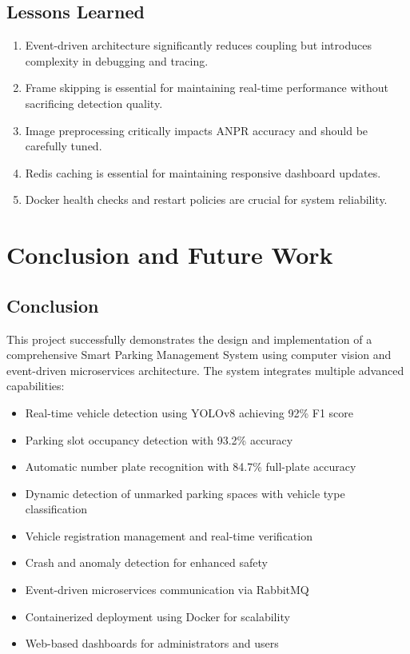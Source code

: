 \documentclass[12pt,a4paper]{report}
\begin{document}
\section{Lessons Learned}

\begin{enumerate}
    \item Event-driven architecture significantly reduces coupling but introduces complexity in debugging and tracing.
    \item Frame skipping is essential for maintaining real-time performance without sacrificing detection quality.
    \item Image preprocessing critically impacts ANPR accuracy and should be carefully tuned.
    \item Redis caching is essential for maintaining responsive dashboard updates.
    \item Docker health checks and restart policies are crucial for system reliability.
\end{enumerate}


\chapter{Conclusion and Future Work}

\section{Conclusion}

This project successfully demonstrates the design and implementation of a comprehensive Smart Parking Management System using computer vision and event-driven microservices architecture. The system integrates multiple advanced capabilities:

\begin{itemize}
    \item Real-time vehicle detection using YOLOv8 achieving 92\% F1 score
    \item Parking slot occupancy detection with 93.2\% accuracy
    \item Automatic number plate recognition with 84.7\% full-plate accuracy
    \item Dynamic detection of unmarked parking spaces with vehicle type classification
    \item Vehicle registration management and real-time verification
    \item Crash and anomaly detection for enhanced safety
    \item Event-driven microservices communication via RabbitMQ
    \item Containerized deployment using Docker for scalability
    \item Web-based dashboards for administrators and users
\end{itemize}
\end{document}
